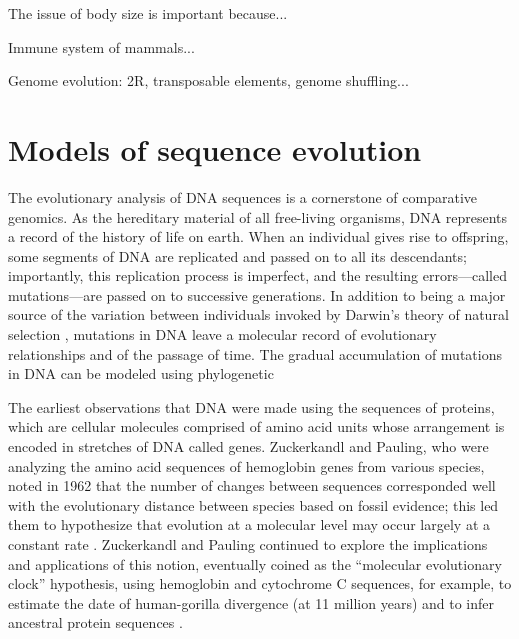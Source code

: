 The issue of body size is important because... 

Immune system of mammals...

Genome evolution: 2R, transposable elements, genome shuffling...



  \label{evolution_intro}




\section{Models of sequence evolution}
\label{codon_intro}

The evolutionary analysis of DNA sequences is a cornerstone of
comparative genomics. As the hereditary material of all free-living
organisms, DNA represents a record of the history of life on
earth. When an individual gives rise to offspring, some segments of
DNA are replicated and passed on to all its descendants; importantly,
this replication process is imperfect, and the resulting
errors---called mutations---are passed on to successive
generations. In addition to being a major source of the variation
between individuals invoked by Darwin's theory of natural selection
\citep{TODO}, mutations in DNA leave a molecular record of
evolutionary relationships and of the passage of time. The gradual
accumulation of mutations in DNA can be modeled using phylogenetic 

The earliest observations that DNA 
were made using the sequences of proteins, which are cellular
molecules comprised of amino acid units whose arrangement is encoded
in stretches of DNA called genes. Zuckerkandl and Pauling, who were
analyzing the amino acid sequences of hemoglobin genes from various
species, noted in 1962 that the number of changes between sequences
corresponded well with the evolutionary distance between species based
on fossil evidence; this led them to hypothesize that evolution at a
molecular level may occur largely at a constant rate
\citep{Zuckerkandl1962,Morgan1998}. Zuckerkandl and Pauling continued
to explore the implications and applications of this notion,
eventually coined as the ``molecular evolutionary clock'' hypothesis,
using hemoglobin and cytochrome C sequences, for example, to estimate
the date of human-gorilla divergence (at 11 million years) and to
infer ancestral protein sequences \citep{Zuckerkandl1965}.

